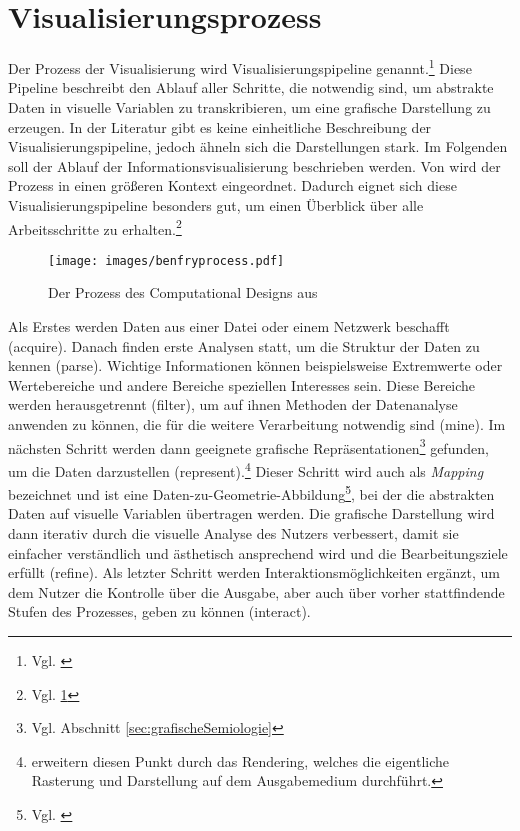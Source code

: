 \documentclass[a4paper, 
               12pt,
               DIV=calc,
               version=first,
               pdftex,
               headsepline,
               footsepline,
               bibtotocnumbered,
               liststotocnumbered]{scrreprt}
\begin{document}
\section{Visualisierungsprozess}
\label{sec:Pipeline}
Der Prozess der Visualisierung wird Visualisierungspipeline genannt.\footnote{Vgl. \citep[S.\,15]{Schumann}}
Diese Pipeline beschreibt den Ablauf aller
Schritte, die notwendig sind, um abstrakte Daten in visuelle Variablen
zu transkribieren, um eine grafische Darstellung zu erzeugen. In der Literatur gibt es keine einheitliche
Beschreibung der Visualisierungspipeline, jedoch ähneln sich die Darstellungen stark.
Im Folgenden soll der Ablauf der Informationsvisualisierung
beschrieben werden. Von \cite{BenFry} wird der Prozess in einen
größeren Kontext eingeordnet. Dadurch eignet sich diese
Visualisierungspipeline besonders gut, um einen Überblick über alle Arbeitsschritte zu erhalten.\footnote{Vgl. \ref{fig:benfryprocess}}
\begin{figure}
\centering
\texttt{[image: images/benfryprocess.pdf]}
\caption{Der Prozess des Computational Designs aus \cite[S.\,13]{BenFry}}
\label{fig:benfryprocess}
\end{figure}
Als Erstes werden Daten aus einer Datei oder einem Netzwerk
beschafft (acquire). Danach finden erste Analysen statt, um die Struktur der Daten zu kennen (parse).
Wichtige Informationen können beispielsweise Extremwerte oder Wertebereiche und andere Bereiche speziellen
Interesses sein.
Diese Bereiche werden herausgetrennt (filter), um auf ihnen Methoden der Datenanalyse anwenden zu können,
die für die weitere Verarbeitung notwendig sind (mine). Im nächsten Schritt werden dann geeignete
grafische Repräsentationen\footnote{Vgl. Abschnitt \ref{sec:grafischeSemiologie}} gefunden, um die Daten
darzustellen (represent).\footnote{\cite{Schumann} erweitern diesen Punkt durch das Rendering, welches die eigentliche Rasterung
und Darstellung auf dem Ausgabemedium durchführt.}
Dieser Schritt wird auch als \textit{Mapping} bezeichnet und ist eine
Daten-zu-Geometrie-Abbildung\footnote{Vgl. \citep[S.\,16]{Schumann}}, bei der
die abstrakten Daten auf visuelle Variablen übertragen werden.
Die grafische Darstellung wird dann iterativ durch die visuelle Analyse des Nutzers
verbessert, damit sie einfacher verständlich und ästhetisch ansprechend wird und die Bearbeitungsziele erfüllt (refine). Als letzter
Schritt werden Interaktionsmöglichkeiten ergänzt, um dem Nutzer die Kontrolle über die
Ausgabe, aber auch über vorher stattfindende Stufen des Prozesses, geben zu können (interact).
\end{document}
